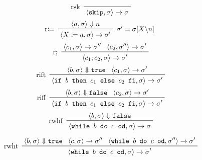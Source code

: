 			    \begin{multicols}{2}
			    	\begin{equation*}
				    	\prftree[l]
					    	{ rsk }
					    	{ \langle \texttt{skip}, \sigma \rangle \rightarrow \sigma }
			    	\end{equation*}
			    	\begin{equation*}
				    	\prftree[l, r]
					    	{ $ \sigma' = \sigma[X \backslash n] $ }
					    	{ r$ \coloneqq $ }
					    	{ \langle a, \sigma \rangle \Downarrow n }
					    	{ \langle X \coloneqq a, \sigma \rangle \rightarrow \sigma' }
			    	\end{equation*}
			    	\begin{equation*}
				    	\prftree[l]
					    	{ r; }
					    	{ \langle c _ 1, \sigma \rangle \rightarrow \sigma'' }
					    	{ \langle c _ 2, \sigma'' \rangle \rightarrow \sigma' }
					    	{ \langle c _ 1 ; c _ 2, \sigma \rangle \rightarrow \sigma' }
			    	\end{equation*}
			    	\begin{equation*}
					    \prftree[l]
						    { rift }
						    { \langle b, \sigma \rangle \Downarrow \texttt{true} }
						    { \langle c _ 1, \sigma \rangle \rightarrow \sigma' }
						    { \langle \texttt{if } b \texttt{ then } c _ 1 \texttt{ else } c _ 2 \texttt{ fi}, \sigma \rangle \rightarrow \sigma' }
			    	\end{equation*}
			    	\begin{equation*}
				    	\prftree[l]
					    	{ riff }
					    	{ \langle b, \sigma \rangle \Downarrow \texttt{false} }
					    	{ \langle c _ 2, \sigma \rangle \rightarrow \sigma' }
					    	{ \langle \texttt{if } b \texttt{ then } c _ 1 \texttt{ else } c _ 2 \texttt{ fi}, \sigma \rangle \rightarrow \sigma' }
			    	\end{equation*}
			    	\begin{equation*}
				    	\prftree[l]
					    	{ rwhf }
					    	{ \langle b, \sigma \rangle \Downarrow \texttt{false} }
					    	{ \langle \texttt{while } b \texttt{ do } c \texttt{ od}, \sigma \rangle \rightarrow \sigma }
			    	\end{equation*}
			    \end{multicols}
			    \vspace{-0.4cm}
			    \begin{equation*}
				    \prftree[l]
					    { rwht }
					    { \langle b, \sigma \rangle \Downarrow \texttt{true} }
					    { \langle c, \sigma \rangle \rightarrow \sigma'' }
					    { \langle \texttt{while } b \texttt{ do } c \texttt{ od}, \sigma'' \rangle \rightarrow \sigma' }
					    { \langle \texttt{while } b \texttt{ do } c \texttt{ od}, \sigma \rangle \rightarrow \sigma' }
			    \end{equation*}
	    
